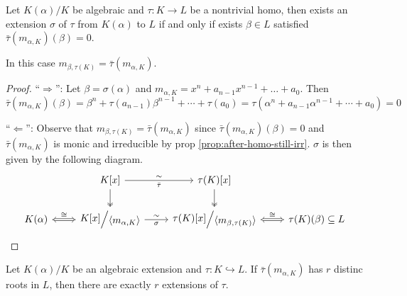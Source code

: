 \begin{lemma} \label{lemma:extension-exists-condition}
  Let $K(\alpha) / K$ be algebraic and $\tau: K \to L$ be a nontrivial homo,
  then exists an extension $\sigma$ of $\tau$ from $K(\alpha)$ to $L$ if and only if
  exists $\beta \in L$ satisfied $\bar\tau(m_{\alpha, K})(\beta) = 0$.

  In this case $m_{\beta, \tau(K)} = \bar\tau(m_{\alpha, K})$.

\begin{proof}
  ``$\Rightarrow$'': Let $\beta = \sigma(\alpha)$ and $m_{\alpha, K} = x^n + a_{n-1} x^{n-1} + \ldots + a_0$.
  Then $\bar\tau(m_{\alpha, K})(\beta) = \beta^n + \tau(a_{n-1})\beta^{n-1} + \cdots + \tau(a_0)
  = \tau(\alpha^n + a_{n-1} \alpha^{n-1} + \cdots + a_0) = 0$

  ``$\Leftarrow$'': Observe that $m_{\beta, \tau(K)} = \bar\tau(m_{\alpha, K})$ since
  $\bar\tau(m_{\alpha, K})(\beta) = 0$ and $\bar\tau(m_{\alpha, K})$ is monic and irreducible
  by prop \ref{prop:after-homo-still-irr}. $\sigma$ is then given by the following diagram.
  \[
    \begin{tikzcd}
      & K[x] \arrow[r, "\sim", "\bar\tau"'] \arrow[d, two heads]
      & \tau(K)[x] \arrow[d, two heads] \\
      K(\alpha) \arrow[r, Leftrightarrow, "\cong"]
      & \raisebox{.1em}{$K[x]$} \Big/ \raisebox{-.1em}{$\langle m_{\alpha, K} \rangle$}
      \arrow[r, "\sim", "\sigma"']
      & \raisebox{.1em}{$\tau(K)[x]$} \Big/ \raisebox{-.1em}{$\langle m_{\beta, \tau(K)} \rangle$}
      \arrow[r, Leftrightarrow, "\cong"]
      & \tau(K)(\beta) \subseteq L
    \end{tikzcd}
  \]
\end{proof}
\end{lemma}

\begin{coro} \label{coro:num-of-extensions}
  Let $K(\alpha)/K$ be an algebraic extension and $\tau: K \hookrightarrow L$.
  If $\bar\tau(m_{\alpha, K})$ has $r$ distinc roots in $L$, then there are exactly $r$ extensions of $\tau$.
\end{coro}

